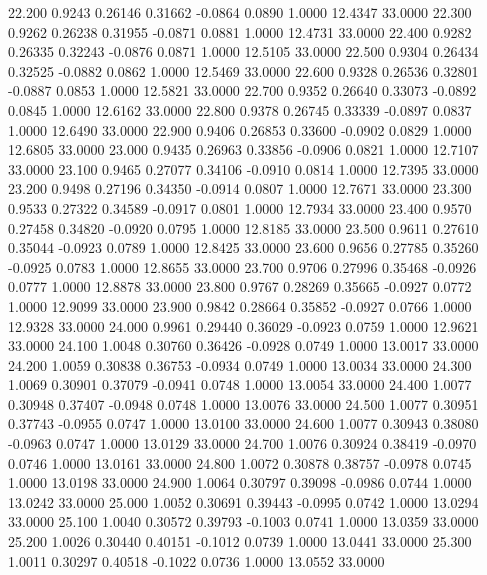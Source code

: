   22.200   0.9243   0.26146   0.31662  -0.0864   0.0890   1.0000  12.4347  33.0000
  22.300   0.9262   0.26238   0.31955  -0.0871   0.0881   1.0000  12.4731  33.0000
  22.400   0.9282   0.26335   0.32243  -0.0876   0.0871   1.0000  12.5105  33.0000
  22.500   0.9304   0.26434   0.32525  -0.0882   0.0862   1.0000  12.5469  33.0000
  22.600   0.9328   0.26536   0.32801  -0.0887   0.0853   1.0000  12.5821  33.0000
  22.700   0.9352   0.26640   0.33073  -0.0892   0.0845   1.0000  12.6162  33.0000
  22.800   0.9378   0.26745   0.33339  -0.0897   0.0837   1.0000  12.6490  33.0000
  22.900   0.9406   0.26853   0.33600  -0.0902   0.0829   1.0000  12.6805  33.0000
  23.000   0.9435   0.26963   0.33856  -0.0906   0.0821   1.0000  12.7107  33.0000
  23.100   0.9465   0.27077   0.34106  -0.0910   0.0814   1.0000  12.7395  33.0000
  23.200   0.9498   0.27196   0.34350  -0.0914   0.0807   1.0000  12.7671  33.0000
  23.300   0.9533   0.27322   0.34589  -0.0917   0.0801   1.0000  12.7934  33.0000
  23.400   0.9570   0.27458   0.34820  -0.0920   0.0795   1.0000  12.8185  33.0000
  23.500   0.9611   0.27610   0.35044  -0.0923   0.0789   1.0000  12.8425  33.0000
  23.600   0.9656   0.27785   0.35260  -0.0925   0.0783   1.0000  12.8655  33.0000
  23.700   0.9706   0.27996   0.35468  -0.0926   0.0777   1.0000  12.8878  33.0000
  23.800   0.9767   0.28269   0.35665  -0.0927   0.0772   1.0000  12.9099  33.0000
  23.900   0.9842   0.28664   0.35852  -0.0927   0.0766   1.0000  12.9328  33.0000
  24.000   0.9961   0.29440   0.36029  -0.0923   0.0759   1.0000  12.9621  33.0000
  24.100   1.0048   0.30760   0.36426  -0.0928   0.0749   1.0000  13.0017  33.0000
  24.200   1.0059   0.30838   0.36753  -0.0934   0.0749   1.0000  13.0034  33.0000
  24.300   1.0069   0.30901   0.37079  -0.0941   0.0748   1.0000  13.0054  33.0000
  24.400   1.0077   0.30948   0.37407  -0.0948   0.0748   1.0000  13.0076  33.0000
  24.500   1.0077   0.30951   0.37743  -0.0955   0.0747   1.0000  13.0100  33.0000
  24.600   1.0077   0.30943   0.38080  -0.0963   0.0747   1.0000  13.0129  33.0000
  24.700   1.0076   0.30924   0.38419  -0.0970   0.0746   1.0000  13.0161  33.0000
  24.800   1.0072   0.30878   0.38757  -0.0978   0.0745   1.0000  13.0198  33.0000
  24.900   1.0064   0.30797   0.39098  -0.0986   0.0744   1.0000  13.0242  33.0000
  25.000   1.0052   0.30691   0.39443  -0.0995   0.0742   1.0000  13.0294  33.0000
  25.100   1.0040   0.30572   0.39793  -0.1003   0.0741   1.0000  13.0359  33.0000
  25.200   1.0026   0.30440   0.40151  -0.1012   0.0739   1.0000  13.0441  33.0000
  25.300   1.0011   0.30297   0.40518  -0.1022   0.0736   1.0000  13.0552  33.0000
